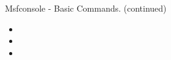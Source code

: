 \begin{frame}[t]{Msfconsole - Basic Commands. (continued)}
  \begin{itemize}
    \setlength{\itemsep}{0.12cm}
      \item {}
      \item {}
      \item {}
  \end{itemize}
\end{frame}
